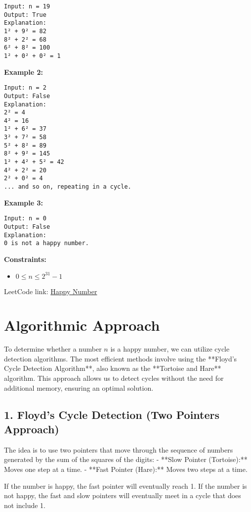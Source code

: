 \begin{verbatim}
Input: n = 19
Output: True
Explanation: 
1² + 9² = 82
8² + 2² = 68
6² + 8² = 100
1² + 0² + 0² = 1
\end{verbatim}

\textbf{Example 2:}

\begin{verbatim}
Input: n = 2
Output: False
Explanation: 
2² = 4
4² = 16
1² + 6² = 37
3² + 7² = 58
5² + 8² = 89
8² + 9² = 145
1² + 4² + 5² = 42
4² + 2² = 20
2² + 0² = 4
... and so on, repeating in a cycle.
\end{verbatim}

\textbf{Example 3:}

\begin{verbatim}
Input: n = 0
Output: False
Explanation: 
0 is not a happy number.
\end{verbatim}

\textbf{Constraints:}

\begin{itemize}
    \item \(0 \leq n \leq 2^{31} - 1\)
\end{itemize}

LeetCode link: \href{https://leetcode.com/problems/happy-number/}{Happy Number}

\section*{Algorithmic Approach}

To determine whether a number \(n\) is a happy number, we can utilize cycle detection algorithms. The most efficient methods involve using the **Floyd's Cycle Detection Algorithm**, also known as the **Tortoise and Hare** algorithm. This approach allows us to detect cycles without the need for additional memory, ensuring an optimal solution.

\subsection*{1. Floyd's Cycle Detection (Two Pointers Approach)}

The idea is to use two pointers that move through the sequence of numbers generated by the sum of the squares of the digits:
- **Slow Pointer (Tortoise):** Moves one step at a time.
- **Fast Pointer (Hare):** Moves two steps at a time.

If the number is happy, the fast pointer will eventually reach 1. If the number is not happy, the fast and slow pointers will eventually meet in a cycle that does not include 1.

